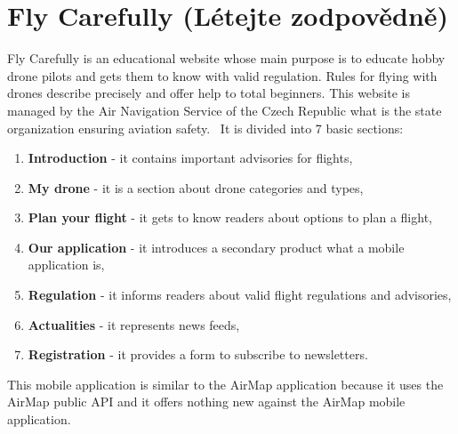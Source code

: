 \section{Fly Carefully (L{\' e}tejte zodpov{\v e}dn{\v e})}\label{sec:fly-carefully}
Fly Carefully is an educational website whose main purpose is to educate hobby drone pilots and gets them to know with valid regulation.
Rules for flying with drones describe precisely and offer help to total beginners.
This website is managed by the Air Navigation Service of the Czech Republic what is the state organization ensuring aviation safety.~\cite{flyCarefully}
It is divided into 7 basic sections:
\begin{enumerate}
    \item \textbf{Introduction} - it contains important advisories for flights,
    \item \textbf{My drone} - it is a section about drone categories and types,
    \item \textbf{Plan your flight} - it gets to know readers about options to plan a flight,
    \item \textbf{Our application} - it introduces a secondary product what a mobile application is,
    \item \textbf{Regulation} - it informs readers about valid flight regulations and advisories,
    \item \textbf{Actualities} - it represents news feeds,
    \item \textbf{Registration} - it provides a form to subscribe to newsletters.
\end{enumerate}
This mobile application is similar to the AirMap application because it uses the AirMap public API and it offers nothing new against the AirMap mobile application.
